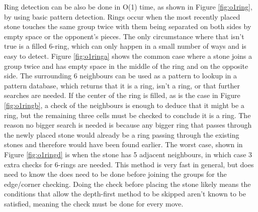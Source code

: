 Ring detection can be also be done in O(1) time, as shown in Figure \ref{fig:o1ring}, by using basic pattern detection. Rings occur when the most recently placed stone touches the same group twice with them being separated on both sides by empty space or the opponent's pieces. The only circumstance where that isn't true is a filled 6-ring, which can only happen in a small number of ways and is easy to detect. Figure \ref{fig:o1ringa} shows the common case where a stone joins a group twice and has empty space in the middle of the ring and on the opposite side. The surrounding 6 neighbours can be used as a pattern to lookup in a pattern database, which returns that it is a ring, isn't a ring, or that further searches are needed. If the center of the ring is filled, as is the case in Figure \ref{fig:o1ringb}, a check of the neighbours is enough to deduce that it might be a ring, but the remaining three cells must be checked to conclude it is a ring. The reason no bigger search is needed is because any bigger ring that passes through the newly placed stone would already be a ring passing through the existing stones and therefore would have been found earlier. The worst case, shown in Figure \ref{fig:o1ringd} is when the stone has 5 adjacent neighbours, in which case 3 extra checks for 6-rings are needed. This method is very fast in general, but does need to know the  does need to be done before joining the groups for the edge/corner checking. Doing the check before placing the stone likely means the conditions that allow the depth-first method to be skipped aren't known to be satisfied, meaning the check must be done for every move.

